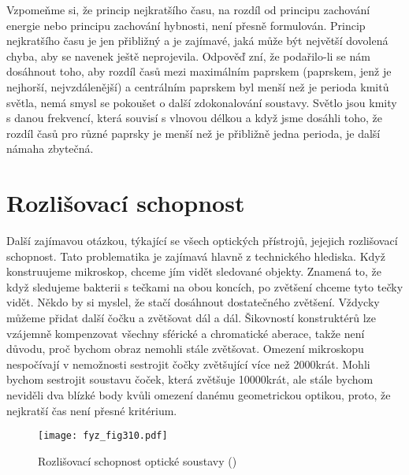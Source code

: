     Vzpomeňme si, že princip nejkratšího času, na rozdíl od principu zachování energie nebo 
    principu zachování hybnosti, není přesně formulován. Princip nejkratšího času je jen přibližný 
    a je zajímavé, jaká může být největší dovolená chyba, aby se navenek ještě neprojevila. Odpověď 
    zní, že podařilo-li se nám dosáhnout toho, aby rozdíl časů mezi maximálním paprskem (paprskem, 
    jenž je nejhorší, nejvzdálenější) a centrálním paprskem byl menší než je perioda kmitů světla, 
    nemá smysl se pokoušet o další zdokonalování soustavy. Světlo jsou kmity s danou frekvencí, 
    která souvisí s vlnovou délkou a když jsme dosáhli toho, že rozdíl časů pro různé paprsky je 
    menší než je přibližně jedna perioda, je další námaha zbytečná.
  
  \section{Rozlišovací schopnost}\label{fyz:IchapXXVIIsecVII}
    Další zajímavou otázkou, týkající se všech optických přístrojů, jejejich rozlišovací schopnost. 
    Tato problematika je zajímavá hlavně z technického hlediska. Když konstruujeme mikroskop, 
    chceme jím vidět sledované objekty. Znamená to, že když sledujeme bakterii s tečkami na obou 
    koncích, po zvětšení chceme tyto tečky vidět. Někdo by si myslel, že stačí dosáhnout 
    dostatečného zvětšení. Vždycky můžeme přidat další čočku a zvětšovat dál a dál. Šikovností 
    konstruktérů lze vzájemně kompenzovat všechny sférické a chromatické aberace, takže není 
    důvodu, proč bychom obraz nemohli stále zvětšovat. Omezení mikroskopu nespočívají v nemožnosti 
    sestrojit čočky zvětšující více než \num{2000}krát. Mohli bychom sestrojit soustavu čoček, 
    která zvětšuje \num{10 000}krát, ale stále bychom neviděli dva blízké body kvůli omezení danému 
    geometrickou optikou, proto, že nejkratší čas není přesné kritérium.
    
    \begin{figure}[ht!] %
      \centering
      \texttt{[image: fyz\_fig310.pdf]}
      \caption{Rozlišovací schopnost optické soustavy
               (\cite[s.~355]{Feynman01})}
      \label{fyz:fig310}
    \end{figure}
    
